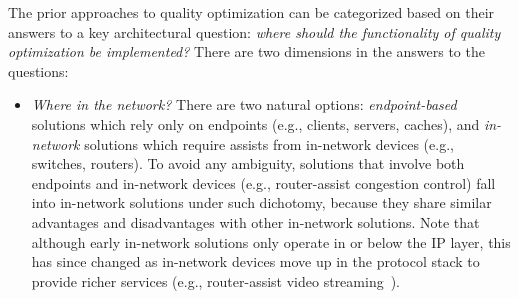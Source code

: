 The prior approaches to quality optimization can be categorized
based on their answers to a key architectural question: {\em where should the
functionality of quality optimization be implemented?}
There are two dimensions in the answers to the questions:
\begin{itemize}

\item {\em Where in the network?} 
There are two natural options: 
{\em endpoint-based} solutions which rely only on endpoints (e.g., clients, 
servers, caches), and 
{\em in-network} solutions which require assists from in-network devices 
(e.g., switches, routers).
To avoid any ambiguity, solutions that involve both endpoints and in-network 
devices (e.g., router-assist congestion control) fall into in-network solutions
under such dichotomy,
because they share similar advantages and disadvantages with other 
in-network solutions.
Note that although early in-network solutions only operate in or below the IP layer, 
this has since changed as in-network devices move up in the protocol stack to 
provide richer services (e.g., router-assist video 
streaming~\cite{sdndash}).




\end{itemize}

